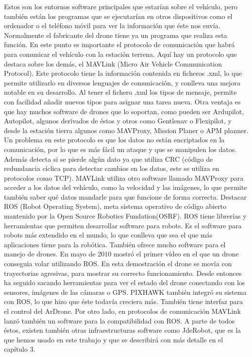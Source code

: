 Estos son los entornos software principales que estarían sobre el vehículo, pero
también están los programas que se ejecutarían en otros dispositivos como el ordenador
o el teléfono móvil para ver la información que éste nos envía. Normalmente el
fabricante del drone tiene ya un programa que realiza esta función.
En este punto es importante el protocolo de comunicación que habrá para
comunicar el vehículo con la estación terrena. Aquí hay un protocolo que destaca
sobre los demás, el MAVLink (Micro Air Vehicle Communication Protocol). Este
protocolo tiene la información contenida en ficheros .xml, lo que permite utilizarlo en
diversos lenguajes de comunicación, y conlleva una mejora notable en su desarrollo. Al
tener el fichero .xml los tipos de mensaje, permite con facilidad añadir nuevos tipos
para asignar una tarea nueva. Otra ventaja es que hay muchos software de drones
que lo soportan, como pueden ser Ardupilot, Autopilot, algunos derivados de éstos y
otros como Gentlenav o Flexipilot, y desde la estación tierra algunos como MAVProxy,
Mission Planer o APM planner. Un problema en este protocolo es que los datos no están
encriptados en la comunicación, por lo que es más fácil un ataque y que se manipulen
los datos. Además detecta si se pierde algún dato ya que utiliza CRC (código de
redundancia cíclica para detectar cambios en los datos, este se utiliza en protocolos
como TCP). MAVLink utiliza otro software llamado MAVProxy para acceder a los
datos del vehículo, como la velocidad y las imágenes, lo que permite también saber qué
datos mandarle para que funcione de forma correcta.
Destacar ROS (Robot Operating System), meta sistema operativo de código
abierto mantenido por la Open Source Robotics Fundation(OSRF). ROS tiene librerías
y herramientas que permiten desarrollar software para robots. Es el software para
robots más extendido en el mundo, lo que conlleva que sea el que más aplicaciones
tiene para la robótica. También ofrece mucho software para el manejo de drones. En
mayo de 2010 mostró el primer vídeo en el que un drone conseguia volar utilizando
ROS. En esta demostración el drone se movía con trayectorias agresivas, para mostrar
su correcto funcionamiento. Desde entonces ha seguido sacando herramientas para
ver el estado del drone conectando con los sensores, imágenes de las cámaras o GPS.
PIXHAWK también integró su sistema con ROS, lo que hizo que éste todavía creciera
más. También tiene interfaz para el control del ArDrone. Por otro lado, en protocolos
de comunicación MAVLink lanzó también un software para la compatibilidad con ROS.
A parte de todos éstos, existen también otras infraestructuras software como
JdeRobot, que es la que hemos usado en este trabajo y que se describirá con más detalle
en el capítulo 3.

